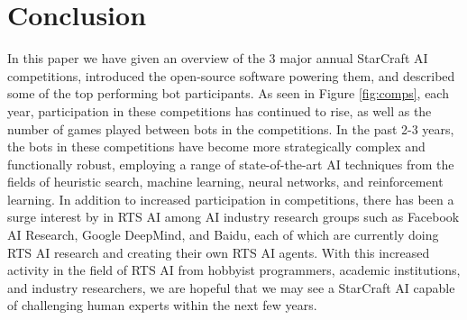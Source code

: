 \section{Conclusion}\label{secConclusion}

In this paper we have given an overview of the 3 major annual StarCraft AI competitions, introduced the open-source software powering them, and described some of the top performing bot participants. As seen in Figure \ref{fig:comps}, each year, participation in these competitions has continued to rise, as well as the number of games played between bots in the competitions. In the past 2-3 years, the bots in these competitions have become more strategically complex and functionally robust, employing a range of state-of-the-art AI techniques from the fields of heuristic search, machine learning, neural networks, and reinforcement learning. In addition to increased participation in competitions, there has been a surge interest by in RTS AI among AI industry research groups such as Facebook AI Research, Google DeepMind, and Baidu, each of which are currently doing RTS AI research and creating their own RTS AI agents. With this increased activity in the field of RTS AI from hobbyist programmers, academic institutions, and industry researchers, we are hopeful that we may see a StarCraft AI capable of challenging human experts within the next few years.

